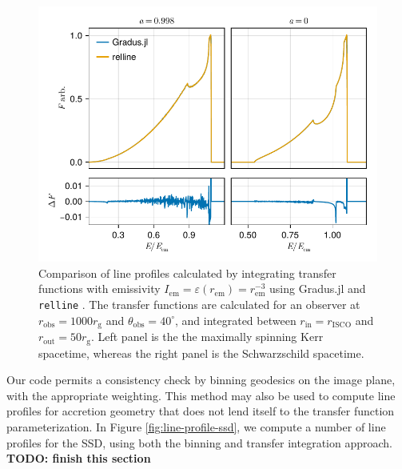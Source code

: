 \documentclass[fleqn,usenatbib]{mnras}
\newcommand{\todo}[1]{{\noindent \bf \color{red} TODO: #1}}
\newcommand{\Gradus}{Gradus.jl }
\newcommand{\relline}{\texttt{relline} }
\newcommand{\rg}{r_\text{g}}
\newcommand{\risco}{r_\text{ISCO}}
\begin{document}
\begin{figure}
	\centering
	\includegraphics[width=0.99\linewidth]{figures/lineprofiles.comparison.pdf}
	\caption{Comparison of line profiles calculated by integrating transfer functions with emissivity $I_\text{em} = \varepsilon(r_\text{em}) = r_\text{em}^{-3}$ using \Gradus and \relline. The transfer functions are calculated for an observer at $r_\text{obs} = 1000\rg$ and $\theta_\text{obs} = 40^\circ$, and integrated between $r_\text{in} = \risco$ and $r_\text{out} = 50 \rg$. Left panel is the the maximally spinning Kerr spacetime, whereas the right panel is the Schwarzschild spacetime.}
	\label{fig:relline-comparison}
\end{figure}

Our code permits a consistency check by binning geodesics on the image plane, with the appropriate weighting. This method may also be used to compute line profiles for accretion geometry that does not lend itself to the transfer function parameterization. In Figure \ref{fig:line-profile-ssd}, we compute a number of line profiles for the SSD, using both the binning and transfer integration approach. \todo{finish this section}
\end{document}
